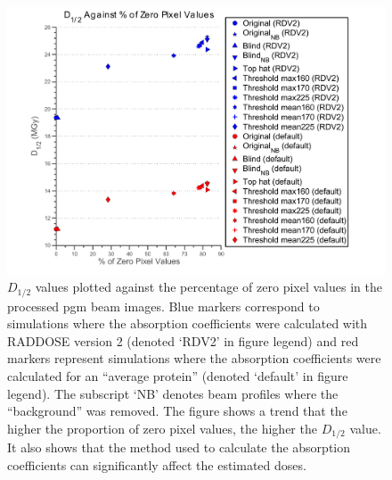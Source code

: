 \begin{figure}
  \centering
    \includegraphics[width=1\textwidth]{figures/beam/d_half_plot.pdf}
    \caption{$D_{1/2}$ values plotted against the percentage of zero pixel values in the processed pgm beam images.
    Blue markers correspond to simulations where the absorption coefficients were calculated with RADDOSE version 2 (denoted `RDV2' in figure legend) and red markers represent simulations where the absorption coefficients were calculated for an ``average protein'' (denoted `default' in figure legend).
    The subscript `NB' denotes beam profiles where the ``background'' was removed.
    The figure shows a trend that the higher the proportion of zero pixel values, the higher the $D_{1/2}$ value.
    It also shows that the method used to calculate the absorption coefficients can significantly affect the estimated doses.}
    \label{figdhalf}
\end{figure}
